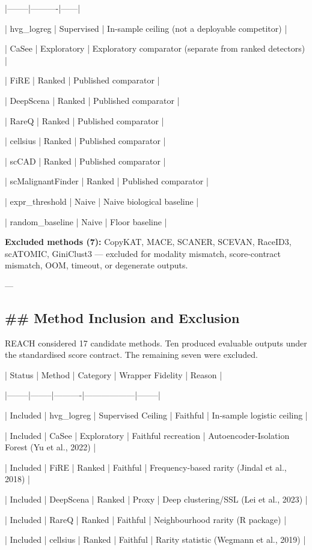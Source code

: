 \documentclass[11pt]{article}
\newcommand{\added}[1]{{\color{trackred}#1}}
\begin{document}
|--------|----------|------|

| hvg\_logreg | Supervised | In-sample ceiling (not a deployable competitor) |

| CaSee | Exploratory | Exploratory comparator (separate from ranked detectors) |

| FiRE | Ranked | Published comparator |

| DeepScena | Ranked | Published comparator |

| RareQ | Ranked | Published comparator |

| cellsius | Ranked | Published comparator |

| scCAD | Ranked | Published comparator |

| scMalignantFinder | Ranked | Published comparator |

| expr\_threshold | Naive | Naive biological baseline |

| random\_baseline | Naive | Floor baseline |

\textbf{Excluded methods (7):} CopyKAT, MACE, SCANER, SCEVAN, RaceID3, scATOMIC, GiniClust3 — excluded for modality mismatch, score-contract mismatch, OOM, timeout, or degenerate outputs.

---

\subsection*{\#\# Method Inclusion and Exclusion}
REACH considered 17 candidate methods. Ten produced evaluable outputs under the standardised score contract. The remaining seven were excluded.

| Status | Method | Category | Wrapper Fidelity | Reason |

|--------|--------|----------|------------------|--------|

| Included | hvg\_logreg | Supervised Ceiling | Faithful | In-sample logistic ceiling |

| Included | CaSee | Exploratory | Faithful \added{recreation} | Autoencoder-Isolation Forest (Yu et al., 2022) |

| Included | FiRE | Ranked | Faithful | Frequency-based rarity (Jindal et al., 2018) |

| Included | DeepScena | Ranked | Proxy | Deep clustering/SSL (Lei et al., 2023) |

| Included | RareQ | Ranked | Faithful | Neighbourhood rarity (R package) |

| Included | cellsius | Ranked | Faithful | Rarity statistic (Wegmann et al., 2019) |
\end{document}
